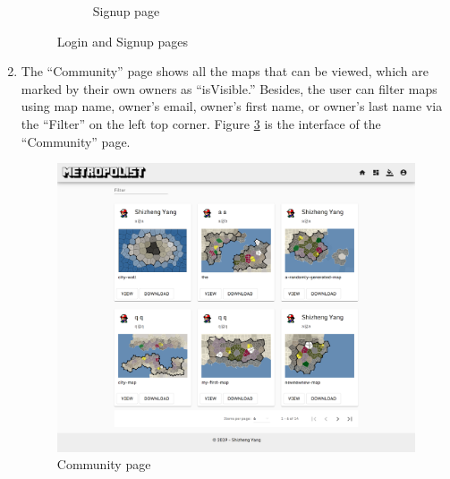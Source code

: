 \begin{enumerate}
\begin{figure}
\begin{subfigure}{.5\textwidth}
      \caption{Signup page}
      \label{fig:GUI signup}
    \end{subfigure}
    \caption{Login and Signup pages}
    \label{fig:Login and Signup pages}
  \end{figure}


  \item The ``Community'' page shows all the maps that can be viewed, which are marked by their own owners as ``isVisible.'' Besides, the user can filter maps using map name, owner's email, owner's first name, or owner's last name via the ``Filter'' on the left top corner. Figure \ref{fig:GUI community} is the interface of the ``Community'' page.

  \begin{figure}[htbp]
    \includegraphics[width=\textwidth]{section04/assets/GUI-community.png}
    \caption{Community page}
    \label{fig:GUI community}
  \end{figure}


\end{enumerate}
